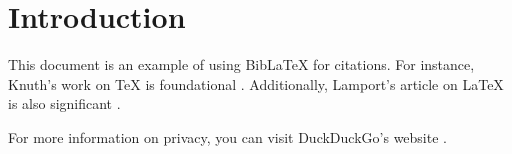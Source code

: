 \documentclass{article}
\begin{document}
	
	\section{Introduction}
	This document is an example of using BibLaTeX for citations. For instance, Knuth's work on \TeX{} is foundational \cite{knuth1984}. Additionally, Lamport's article on LaTeX is also significant \cite{lamport1986}. 
	
	For more information on privacy, you can visit DuckDuckGo's website \cite{duckduckgo2023}.
	
	\printbibliography
	
\end{document}
